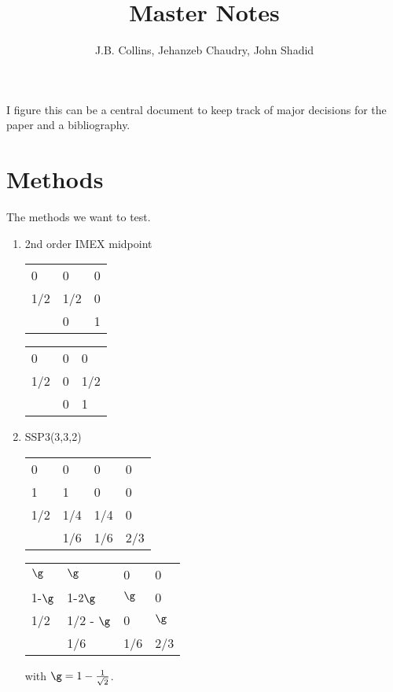 \documentclass{amsart}
\begin{document}
\title{Master Notes}
\author{J.B. Collins, Jehanzeb Chaudry, John Shadid}
\maketitle


I figure this can be a central document to keep track of major decisions for the paper and a bibliography.

\section{Methods}
	The methods we want to test.
	\begin{enumerate}
		\item 2nd order IMEX midpoint \cite{Pareschi:2003}
			\begin{table}[h]
			\begin{tabular}{l|ll}
			0   & 0   & 0 \\
			1/2 & 1/2 & 0 \\ \hline
			    & 0   & 1
			\end{tabular}
			\hspace{.5in}
			\begin{tabular}{l|ll}
			0   & 0 & 0   \\
			1/2 & 0 & 1/2 \\ \hline
			    & 0 & 1  
			\end{tabular}
			\end{table}
		\item SSP3(3,3,2)
		\begin{table}[h]
		\begin{tabular}{l|lll}
		0   & 0   & 0   & 0   \\
		1   & 1   & 0   & 0   \\
		1/2 & 1/4 & 1/4 & 0   \\ \hline
		    & 1/6 & 1/6 & 2/3
		\end{tabular}
		\hspace{.5in}
		\begin{tabular}{l|lll}
		$\g$   & $\g$       & 0    & 0    \\
		1-$\g$ & 1-$2\g$    & $\g$ & 0    \\
		1/2    & 1/2 - $\g$ & 0    & $\g$ \\ \hline
		       & 1/6        & 1/6  & 2/3 
		\end{tabular}
		\end{table}		
		with $\g = 1- \frac{1}{\sqrt{2}}$.
	\end{enumerate}




\end{document}
